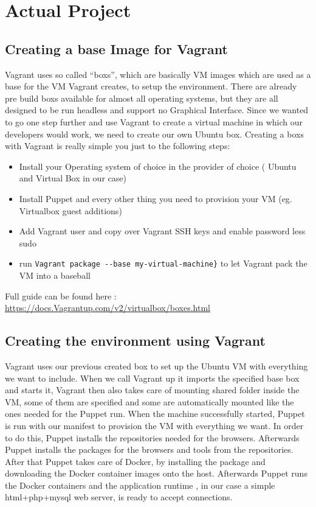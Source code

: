 \section{Actual Project}

\subsection{Creating a base Image for Vagrant}
Vagrant uses so called “\glspl{box}”, which are basically \gls{VM} images which are used as a base for the \gls{VM} Vagrant creates, to setup the environment. There are already pre build \glspl{box} available for almost all operating systems, but they are all designed to be run headless and support no Graphical Interface. Since we wanted to go one step further and use Vagrant to create a virtual machine in which our developers would work, we need to create our own Ubuntu \gls{box}. Creating a \glspl{box} with Vagrant is really simple you just to the following steps:
\begin{itemize}
\item Install your Operating system of choice in the \gls{provider} of choice ( Ubuntu and Virtual Box in our case)
\item Install Puppet and every other thing you need to provision your \gls{VM} (eg. Virtual\gls{box} guest additions)
\item Add Vagrant user and copy over Vagrant SSH keys and enable password less sudo
\item run \verb|Vagrant package --base my-virtual-machine}| to let Vagrant pack the \gls{VM} into a baseball
\end{itemize}
Full guide can be found here : \url{https://docs.Vagrantup.com/v2/virtualbox/boxes.html}



\subsection{Creating the environment using Vagrant}

Vagrant uses our previous created \gls{box} to set up the Ubuntu \gls{VM} with everything we want to include.  When we call Vagrant up it imports the specified base \gls{box} and starts it, Vagrant then also takes care of mounting shared folder inside the \gls{VM}, some of them are specified and some are automatically mounted like the ones needed for the Puppet run. When the machine successfully started, Puppet is run with our manifest to provision the \gls{VM} with everything we want. In order to do this, Puppet installs the repositories needed for the browsers. Afterwards Puppet installs the packages for the browsers and tools from the repositories. After that Puppet takes care of Docker, by installing the package and downloading the Docker container images onto the host. Afterwards Puppet runs the Docker containers and the application runtime , in our case a simple html+php+mysql web server, is ready to accept connections.

